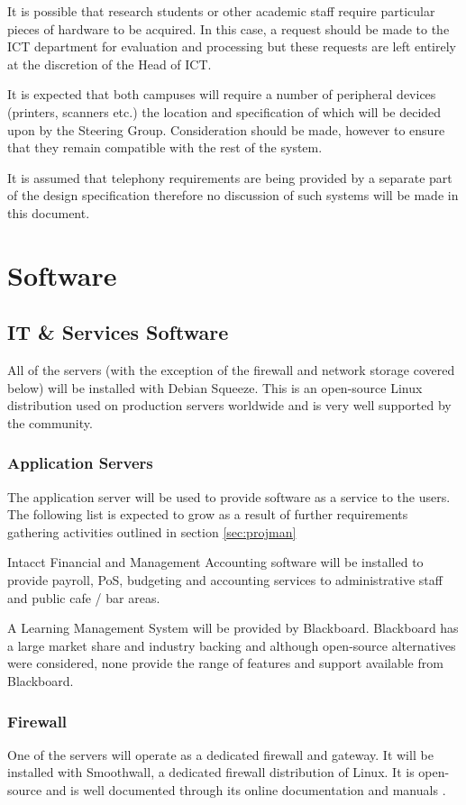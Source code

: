 \documentclass[a4paper, twoside]{article}
\begin{document}
It is possible that research students or other academic staff require particular
pieces of hardware to be acquired. In this case, a request should be made to the
ICT department for evaluation and processing but these requests are left
entirely at the discretion of the Head of ICT.

It is expected that both campuses will require a number of peripheral devices
(printers, scanners etc.) the location and specification of which will be
decided upon by the Steering Group. Consideration should be made, however to
ensure that they remain compatible with the rest of the system.

It is assumed that telephony requirements are being provided by a separate part
of the design specification therefore no discussion of such systems will be made
in this document.

\section{Software}
\subsection{IT \& Services Software}
All of the servers (with the exception of the firewall and network storage
covered below) will be installed with Debian Squeeze. This is an open-source
Linux distribution used on production servers worldwide\cite{debian} and is
very well supported by the community.

\subsubsection{Application Servers}
The application server will be used to provide software as a service to the
users. The following list is expected to grow as a result of further
requirements gathering activities outlined in section \ref{sec:projman}

Intacct Financial and Management Accounting software will be installed to
provide payroll, PoS, budgeting and accounting services to administrative staff
and public cafe / bar areas.

A Learning Management System will be provided by Blackboard. Blackboard has a
large market share and industry backing \cite{bb} and although open-source
alternatives were considered, none provide the range of features and support
available from Blackboard.

\subsubsection{Firewall}
One of the servers will operate as a dedicated firewall and gateway. It will be
installed with Smoothwall, a dedicated firewall distribution of Linux. It is
open-source and is well documented through its online documentation and
manuals \cite{smoothwall}.
\end{document}
